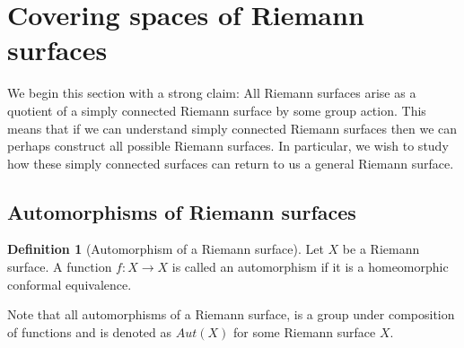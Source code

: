 \documentclass[11pt]{report}
\theoremstyle{definition}
\newtheorem{defn}[thm]{Definition}
\begin{document}
\section{Covering spaces of Riemann surfaces}
We begin this section with a strong claim: All Riemann surfaces arise as a quotient of a simply connected Riemann surface by some group action. This means that if we can understand simply connected Riemann surfaces then we can perhaps construct all possible Riemann surfaces. In particular, we wish to study how these simply connected surfaces can return to us a general Riemann surface.
\subsection{Automorphisms of Riemann surfaces}

\begin{defn}[Automorphism of a Riemann surface]
  Let $X$ be a Riemann surface. A function $f\colon X \rightarrow X$ is called an automorphism if it is a homeomorphic conformal equivalence.
\end{defn}
Note that all automorphisms of a Riemann surface, is a group under composition of functions and is denoted as $Aut(X)$ for some Riemann surface $X$.
\end{document}
